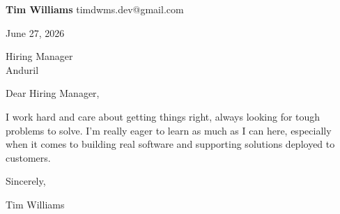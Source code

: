 \documentclass[12pt]{article}
\begin{document}
\textbf{Tim Williams} \hfill timdwms.dev@gmail.com

\vspace{1em}

June 27, 2026

\vspace{1em}

Hiring Manager \\
Anduril

\vspace{1em}

Dear Hiring Manager,

I work hard and care about getting things right, always looking for tough problems to solve. I'm really eager to learn as much as I can here, especially when it comes to building real software and supporting solutions deployed to customers.

\vspace{1em}

Sincerely,

\vspace{2em}

Tim Williams
\end{document}
